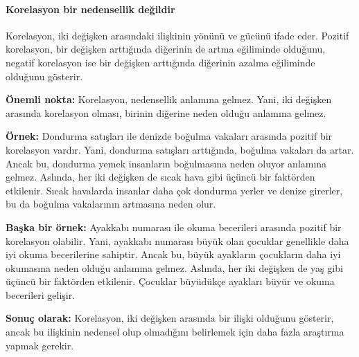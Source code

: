 \documentclass[
  letterpaper,
  DIV=11,
  numbers=noendperiod]{scrartcl}
\let\oldparagraph\paragraph
\renewcommand{\paragraph}[1]{\oldparagraph{#1}\mbox{}}
\begin{document}
\hypertarget{korelasyon-bir-nedensellik-deux11fildir}{%
\paragraph{Korelasyon bir nedensellik
değildir}\label{korelasyon-bir-nedensellik-deux11fildir}}

Korelasyon, iki değişken arasındaki ilişkinin yönünü ve gücünü ifade
eder. Pozitif korelasyon, bir değişken arttığında diğerinin de artma
eğiliminde olduğunu, negatif korelasyon ise bir değişken arttığında
diğerinin azalma eğiliminde olduğunu gösterir.

\textbf{Önemli nokta:} Korelasyon, nedensellik anlamına gelmez. Yani,
iki değişken arasında korelasyon olması, birinin diğerine neden olduğu
anlamına gelmez.

\textbf{Örnek:} Dondurma satışları ile denizde boğulma vakaları arasında
pozitif bir korelasyon vardır. Yani, dondurma satışları arttığında,
boğulma vakaları da artar. Ancak bu, dondurma yemek insanların
boğulmasına neden oluyor anlamına gelmez. Aslında, her iki değişken de
sıcak hava gibi üçüncü bir faktörden etkilenir. Sıcak havalarda insanlar
daha çok dondurma yerler ve denize girerler, bu da boğulma vakalarının
artmasına neden olur.

\textbf{Başka bir örnek:} Ayakkabı numarası ile okuma becerileri
arasında pozitif bir korelasyon olabilir. Yani, ayakkabı numarası büyük
olan çocuklar genellikle daha iyi okuma becerilerine sahiptir. Ancak bu,
büyük ayakların çocukların daha iyi okumasına neden olduğu anlamına
gelmez. Aslında, her iki değişken de yaş gibi üçüncü bir faktörden
etkilenir. Çocuklar büyüdükçe ayakları büyür ve okuma becerileri
gelişir.

\textbf{Sonuç olarak:} Korelasyon, iki değişken arasında bir ilişki
olduğunu gösterir, ancak bu ilişkinin nedensel olup olmadığını
belirlemek için daha fazla araştırma yapmak gerekir.
\end{document}

